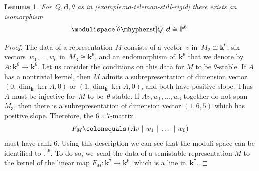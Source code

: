 \documentclass[JEP,XML,SOM,Unicode,NoEqCountersInSection,published]{cedram}
\theoremstyle{plain}
\newtheorem{lemma}[theorem]{Lemma}
\theoremstyle{definition}
\newcommand\field{\mathbf{k}}
\newcommand\stable{\ensuremath{\mhyphen\mathrm{st}}}
\newcommand\tuple[1]{\ensuremath{{\boldsymbol{#1}}}}
\newif\ifcode
\begin{document}
\begin{lemma}
\label{lemma:P6}
For~$Q,\tuple{d},\theta$ as in \cref{example:no-teleman-still-rigid}
there exists an isomorphism
\begin{equation*}
\modulispace[\theta\stable]{Q,\tuple{d}}\cong\mathbb{P}^6.
\end{equation*}
\end{lemma}

\begin{proof}
The data of a representation $M$ consists of
a vector~$v$ in~$M_2\cong\field^6$,
six vectors~$w_1,\dots,w_6$ in~$M_3\cong\field^6$,
and an endomorphism of~$\field^6$ that we denote by~\hbox{$A \colon \field^6 \!\to\! \field^6$}.
Let us consider the conditions on this data for $M$ to be $\theta$-stable.
If $A$ has a nontrivial kernel, then $M$ admits a subrepresentation of dimension vector $(0,\dim_\field\ker A,0)$ or $(1,\dim_\field\ker A,0)$,
and both have positive slope.
Thus $A$ must be injective for~$M$ to be~$\theta$-stable.
If $Av,w_1,\dots,w_6$ together do not span $M_3$,
then there is a subrepresentation of dimension vector $(1,6,5)$ which has positive slope.
Therefore, the $6 \times 7$-matrix
\begin{equation*}
F_{M} \colonequals\left( Av~|~w_1~|~\dots~|~w_6 \right)
\end{equation*}
must have rank $6$.
Using this description we can see that
the moduli space can be identified to $\mathbb{P}^6$.
To do so, we~send the data of a semistable representation $M$ to
the kernel of the linear map $F_M \colon \field^7 \to \field^6$,
which is a line in~$\field^7$.
\end{proof}
\ifcode
Corresponding Sage code below. Version of quiver.tools: commit a07f4f0

\begin{verbatim}
sage: from quiver import *
sage: Q = ThreeVertexQuiver(1,6,1)
sage: d = vector([1,6,6])
sage: theta = Q.canonical_stability_parameter(d)
sage: theta
(42, 5, -12)
sage: is_coprime_for_stability_parameter(d,theta)
True
sage: Q.has_semistable_representation(d,theta)
True
sage: len(Q.all_harder_narasimhan_types(d,theta))
85
sage: hntype = [vector([0,1,0]),vector([1,5,6])]
sage: hntype in Q.all_harder_narasimhan_types(d,theta)
True
sage: Q.codimension_of_harder_narasimhan_stratum(hntype)
1
sage: k1 = slope(hntype[0],theta)
sage: k2 = slope(hntype[1],theta)
sage: print(k1,k2)
5 -5/12
sage: Q.euler_form(hntype[0],hntype[1])
-1
\end{verbatim}
\fi
\end{document}
